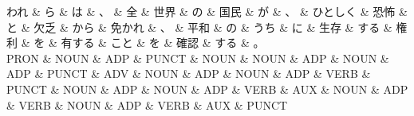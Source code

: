 \documentclass[tikz,border=5pt]{standalone}
\begin{document}
\small
\begin{dependency}[edge unit distance=9.3pt]
    \begin{deptext}[column sep=0.5em]
        われ \& ら \& は \& 、 \& 全 \& 世界 \& の \& 国民 \& が \& 、 \& ひとしく \& 恐怖 \& と \& 欠乏 \& から \& 免かれ \& 、 \& 平和 \& の \& うち \& に \& 生存 \& する \& 権利 \& を \& 有する \& こと \& を \& 確認 \& する \& 。\\
        PRON \& NOUN \& ADP \& PUNCT \& NOUN \& NOUN \& ADP \& NOUN \& ADP \& PUNCT \& ADV \& NOUN \& ADP \& NOUN \& ADP \& VERB \& PUNCT \& NOUN \& ADP \& NOUN \& ADP \& VERB \& AUX \& NOUN \& ADP \& VERB \& NOUN \& ADP \& VERB \& AUX \& PUNCT\\
    \end{deptext}
\end{dependency}
\end{document}
